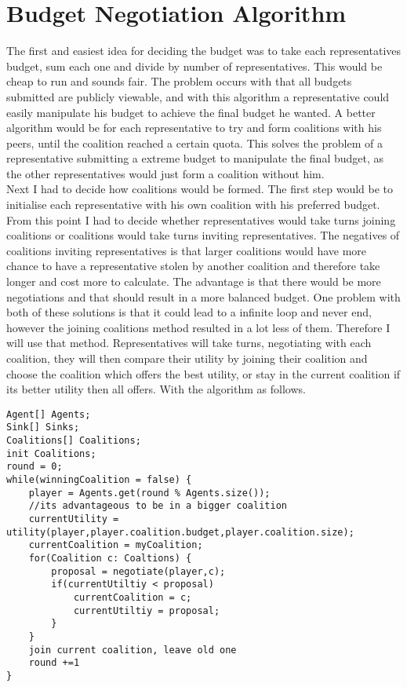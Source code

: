 \section{Budget Negotiation Algorithm}
The first and easiest idea for deciding the budget was to take each representatives budget, sum each one and divide by number of representatives. This would be cheap to run and sounds fair. The problem occurs with that all budgets submitted are publicly viewable, and with this algorithm a representative could easily manipulate his budget to achieve the final budget he wanted. 
A better algorithm would be for each representative to try and form coalitions with his peers, until the coalition reached a certain quota. This solves the problem of a representative submitting a extreme budget to manipulate the final budget, as the other representatives would just form a coalition without him.  
\\
Next I had to decide how coalitions would be formed. The first step would be to initialise each representative with his own coalition with his preferred budget. From this point I had to decide whether representatives would take turns joining coalitions or coalitions would take turns inviting representatives. The negatives of coalitions inviting representatives is that larger coalitions would have more chance to have a representative stolen by another coalition and therefore take longer and cost more to calculate. The advantage is that there would be more negotiations and that should result in a more balanced budget. One problem with both of these solutions is that it could lead to a infinite loop and never end, however the joining coalitions method resulted in a lot less of them. Therefore I will use that method. Representatives will take turns, negotiating with each coalition, they will then compare their utility by joining their coalition and choose the coalition which offers the best utility, or stay in the current coalition if its better utility then all offers. With the algorithm as follows.
\begin{lstlisting}
Agent[] Agents;
Sink[] Sinks;
Coalitions[] Coalitions;
init Coalitions;
round = 0;
while(winningCoalition = false) {
	player = Agents.get(round % Agents.size());
	//its advantageous to be in a bigger coalition
	currentUtility = utility(player,player.coalition.budget,player.coalition.size);
	currentCoalition = myCoalition;
	for(Coalition c: Coaltions) {
		proposal = negotiate(player,c);
		if(currentUtiltiy < proposal)
			currentCoalition = c;
			currentUtiltiy = proposal;
		}
	}
	join current coalition, leave old one
	round +=1
}
\end{lstlisting}
